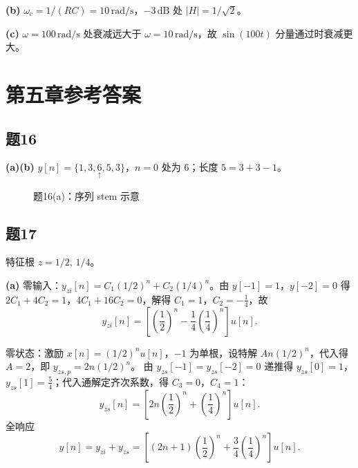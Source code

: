 \documentclass[11pt,a4paper]{ctexart}
\begin{document}
\textbf{(b)} $\omega_c=1/(RC)=10\,\mathrm{rad/s}$，$-3\,\mathrm{dB}$ 处 $|H|=1/\sqrt{2}$。

\textbf{(c)} $\omega=100\,\mathrm{rad/s}$ 处衰减远大于 $\omega=10\,\mathrm{rad/s}$，故 $\sin(100t)$ 分量通过时衰减更大。

\section{第五章参考答案}

\subsection*{题16}

\textbf{(a)(b)} $y[n]=\{1,3,\underset{\uparrow}{6},5,3\}$，$n=0$ 处为 $6$；长度 $5=3+3-1$。

\begin{figure}[htbp]
\centering
{}
\caption{题16(a)：序列 stem 示意}
\end{figure}

\subsection*{题17}

特征根 $z=1/2,\,1/4$。

\textbf{(a)} 零输入：$y_{zi}[n]=C_1(1/2)^n+C_2(1/4)^n$。由 $y[-1]=1$，$y[-2]=0$ 得
$2C_1+4C_2=1$，$4C_1+16C_2=0$，解得 $C_1=1$，$C_2=-\frac{1}{4}$，故
\[
y_{zi}[n]=\left[\left(\frac{1}{2}\right)^n-\frac{1}{4}\left(\frac{1}{4}\right)^n\right]u[n].
\]

零状态：激励 $x[n]=(1/2)^n u[n]$，$-1$ 为单根，设特解 $An(1/2)^n$，代入得 $A=2$，即 $y_{zs,p}=2n(1/2)^n$。
由 $y_{zs}[-1]=y_{zs}[-2]=0$ 递推得 $y_{zs}[0]=1$，$y_{zs}[1]=\frac{5}{4}$；代入通解定齐次系数，得 $C_3=0$，$C_4=1$：
\[
y_{zs}[n]=\left[2n\left(\frac{1}{2}\right)^n+\left(\frac{1}{4}\right)^n\right]u[n].
\]
全响应
\[
y[n]=y_{zi}+y_{zs}=\left[(2n+1)\left(\frac{1}{2}\right)^n+\frac{3}{4}\left(\frac{1}{4}\right)^n\right]u[n].
\]
\end{document}
